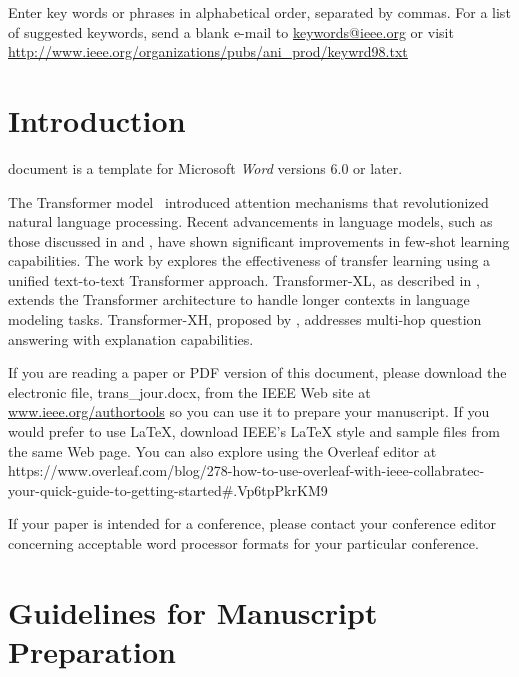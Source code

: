 \documentclass[journal]{IEEEtai}
\begin{document}
\begin{IEEEkeywords}
Enter key words or phrases in alphabetical order, separated by commas. For a list of suggested keywords, send a blank e-mail to \href{mailto:keywords@ieee.org}{\underline{keywords@ieee.org}} or visit \href{http://www.ieee.org/organizations/pubs/ani_prod/keywrd98.txt}{\underline{http://www.ieee.org/organizations/pubs/ani\_prod/keywrd98.txt}}
\end{IEEEkeywords}



\section{Introduction}

 document is a template for Microsoft {\it Word} versions 6.0 or later. 

The Transformer model~\cite{vaswani2017attention} introduced attention mechanisms that revolutionized natural language processing.
Recent advancements in language models, such as those discussed in \cite{radford2019language} and \cite{brown2020language}, have shown significant improvements in few-shot learning capabilities.
The work by \cite{raffel2019exploring} explores the effectiveness of transfer learning using a unified text-to-text Transformer approach.
Transformer-XL, as described in \cite{dai2019transformerxl}, extends the Transformer architecture to handle longer contexts in language modeling tasks.
Transformer-XH, proposed by \cite{zhang2019transformerxh}, addresses multi-hop question answering with explanation capabilities.


If you are reading a paper or PDF version of this document, please download the electronic file, trans\_jour.docx, from the IEEE Web site at \href{http://www.ieee.org/authortools}{www.ieee.org/authortools} so you can use it to prepare your manuscript. If you would prefer to use \LaTeX, download IEEE's  {\LaTeX} style and sample files from the same Web page. You can also explore using the Overleaf editor at {https://www.overleaf.com/blog/278-how-to-use-overleaf-with-ieee-collabratec-your-quick-guide-to-getting-started\#.Vp6tpPkrKM9}

If your paper is intended for a conference, please contact your conference editor concerning acceptable word processor formats for your particular conference.

\section{Guidelines for Manuscript Preparation}
\end{document}
